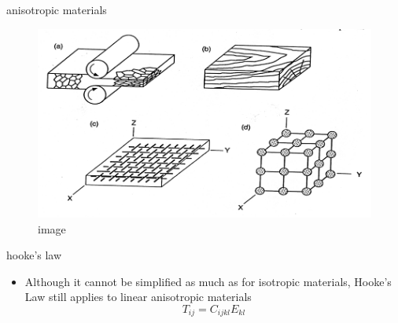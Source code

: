 \documentclass[
  letterpaper,
  ignorenonframetext,
  aspectratio=43,
  handout,
  12pt]{beamer}
\providecommand{\tightlist}{%
  \setlength{\itemsep}{0pt}\setlength{\parskip}{0pt}}
\providecommand{\tightlist}{%
\setlength{\itemsep}{0pt}\setlength{\parskip}{0pt}}
\let\Oldincludegraphics\includegraphics
\renewcommand{\includegraphics}[2][]{\Oldincludegraphics[width=\textwidth,height=0.7\textheight,keepaspectratio]{#2}}
\begin{document}
\begin{frame}{anisotropic materials}
\protect\hypertarget{anisotropic-materials-1}{}
\begin{figure}
\centering
\includegraphics{../images/anisotropy.png}
\caption{image}
\end{figure}
\end{frame}

\begin{frame}{hooke's law}
\protect\hypertarget{hookes-law}{}
\begin{itemize}
\tightlist
\item
  Although it cannot be simplified as much as for isotropic materials,
  Hooke's Law still applies to linear anisotropic materials
  \[T_{ij} = C_{ijkl}E_{kl}\]
\end{itemize}
\end{frame}
\end{document}
